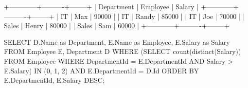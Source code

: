 \begin{Code}
	+------------+----------+--------+
	| Department | Employee | Salary |
	+------------+----------+--------+
	| IT         | Max      | 90000  |
	| IT         | Randy    | 85000  |
	| IT         | Joe      | 70000  |
	| Sales      | Henry    | 80000  |
	| Sales      | Sam      | 60000  |
	+------------+----------+--------+
\end{Code}

\begin{Code}
	SELECT D.Name as Department, E.Name as Employee, E.Salary as Salary 
	FROM Employee E, Department D
	WHERE (SELECT count(distinct(Salary)) FROM Employee 
		   WHERE DepartmentId = E.DepartmentId AND Salary > E.Salary) IN (0, 1, 2)
		   AND E.DepartmentId = D.Id 
	ORDER BY E.DepartmentId, E.Salary DESC;
\end{Code}